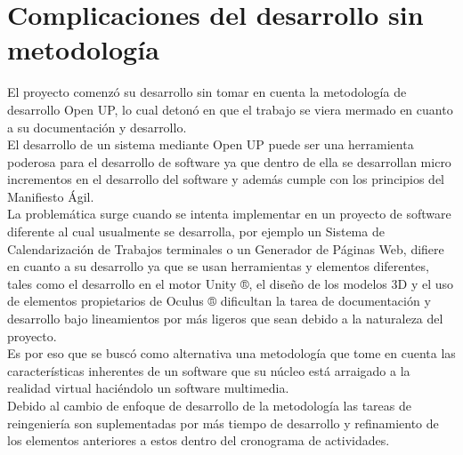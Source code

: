 \section{Complicaciones del desarrollo sin metodología}
El proyecto comenzó su desarrollo sin tomar en cuenta la metodología de desarrollo Open UP, lo cual detonó en que el trabajo se viera mermado en cuanto a su documentación y desarrollo.\\
El desarrollo de un sistema mediante Open UP puede ser una herramienta poderosa para el desarrollo de software ya que dentro de ella se desarrollan micro incrementos en el desarrollo del software y además cumple con los principios del Manifiesto Ágil\cite{beck2001manifesto}.\\
La problemática surge cuando se intenta implementar en un proyecto de software diferente al cual usualmente se desarrolla, por ejemplo un Sistema de Calendarización de Trabajos terminales o un Generador de Páginas Web, difiere en cuanto a su desarrollo ya que se usan herramientas y elementos diferentes, tales como el desarrollo en el motor Unity ®, el diseño de los modelos 3D y el uso de elementos propietarios de Oculus ® dificultan la tarea de documentación y desarrollo bajo lineamientos por más ligeros que sean debido a la naturaleza del proyecto.\\
Es por eso que se buscó como alternativa una metodología que tome en cuenta las características inherentes de un software que su núcleo está arraigado a la realidad virtual haciéndolo un software multimedia.\\
Debido al cambio de enfoque de desarrollo de la metodología las tareas de reingeniería son suplementadas por más tiempo de desarrollo y refinamiento de los elementos anteriores a estos dentro del cronograma de actividades.\\


